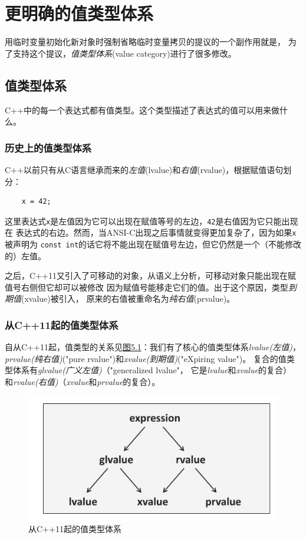 \section{更明确的值类型体系}
用临时变量初始化新对象时强制省略临时变量拷贝的提议的一个副作用就是，
为了支持这个提议，\emph{值类型体系}(value category)进行了很多修改。

\subsection{值类型体系}\label{ch5.3.1}
C++中的每一个表达式都有值类型。这个类型描述了表达式的值可以用来做什么。

\subsubsection{历史上的值类型体系}
C++以前只有从C语言继承而来的\emph{左值}(lvalue)和\emph{右值}(rvalue)，根据赋值语句划分：
\begin{lstlisting}
    x = 42;
\end{lstlisting}
这里表达式\texttt{x}是左值因为它可以出现在赋值等号的左边，\texttt{42}是右值因为它只能出现在
表达式的右边。然而，当ANSI-C出现之后事情就变得更加复杂了，因为如果\texttt{x}被声明为
\texttt{const int}的话它将不能出现在赋值号左边，但它仍然是一个（不能修改的）左值。

之后，C++11又引入了可移动的对象，从语义上分析，可移动对象只能出现在赋值号右侧但它却可以被修改
因为赋值号能移走它们的值。出于这个原因，类型\emph{到期值}(xvalue)被引入，
原来的右值被重命名为\emph{纯右值}(prvalue)。

\subsubsection{从C++11起的值类型体系}
自从C++11起，值类型的关系见\hyperref[f5.1]{图5.1}：我们有了核心的值类型体系\emph{lvalue(左值)}，
\emph{prvalue(纯右值)}("pure rvalue")和\emph{xvalue(到期值)}("eXpiring value")。
复合的值类型体系有\emph{glvalue(广义左值)}（"generalized lvalue"，
它是\emph{lvalue}和\emph{xvalue}的复合）
和\emph{rvalue(右值)}（\emph{xvalue}和\emph{prvalue}的复合）。

\begin{figure}[ht]
    \begin{center}
        \includegraphics[scale=0.8]{../imgs/05.1.png}
        \caption{从C++11起的值类型体系}
        \label{f5.1}
    \end{center}
\end{figure}

